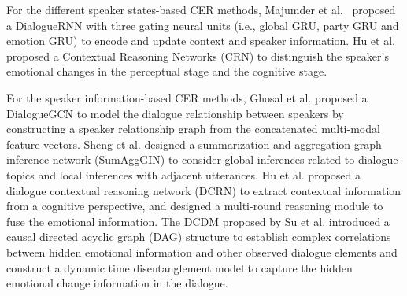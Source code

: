 {{For the different speaker states-based CER methods, Majumder et al.~\cite{majumder2019dialoguernn} proposed a DialogueRNN with three gating neural units (i.e., global GRU, party GRU and emotion GRU) to encode and update context and speaker information. Hu et al. \cite{hu2021dialoguecrn} proposed a Contextual Reasoning Networks (CRN) to distinguish the speaker's emotional changes in the perceptual stage and the cognitive stage.

For the speaker information-based CER methods, Ghosal et al. \cite{ghosal2019dialoguegcn}  proposed a DialogueGCN to model the dialogue relationship between speakers by constructing a speaker relationship graph from the concatenated multi-modal feature vectors. Sheng et al. \cite{sheng2020summarize} designed a summarization and aggregation graph inference network (SumAggGIN) to consider global inferences related to dialogue topics and local inferences with adjacent utterances. Hu et al. \cite{hu2021dialoguecrn} proposed a dialogue contextual reasoning network (DCRN) to extract contextual information from a cognitive perspective, and designed a multi-round reasoning module to fuse the emotional information. {The DCDM proposed by Su et al. \cite{su2024dynamic} introduced a causal directed acyclic graph (DAG) structure to establish complex correlations between hidden emotional information and other observed dialogue elements and construct a dynamic time disentanglement model to capture the hidden emotional change information in the dialogue.}

}}
